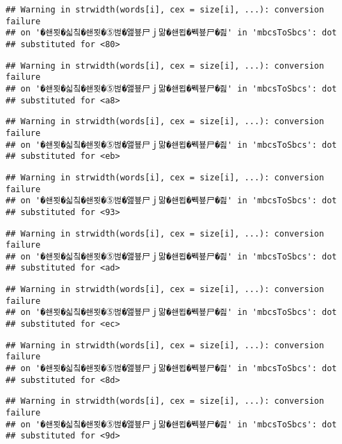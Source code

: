 \documentclass[]{article}
\begin{document}
\begin{verbatim}
## Warning in strwidth(words[i], cex = size[i], ...): conversion failure
## on '�쇈묏�싧칰�쇈묏�⑤벊�앮뵾尸ｊ맒�쇈묍�붹뵾尸�즲' in 'mbcsToSbcs': dot
## substituted for <80>
\end{verbatim}

\begin{verbatim}
## Warning in strwidth(words[i], cex = size[i], ...): conversion failure
## on '�쇈묏�싧칰�쇈묏�⑤벊�앮뵾尸ｊ맒�쇈묍�붹뵾尸�즲' in 'mbcsToSbcs': dot
## substituted for <a8>
\end{verbatim}

\begin{verbatim}
## Warning in strwidth(words[i], cex = size[i], ...): conversion failure
## on '�쇈묏�싧칰�쇈묏�⑤벊�앮뵾尸ｊ맒�쇈묍�붹뵾尸�즲' in 'mbcsToSbcs': dot
## substituted for <eb>
\end{verbatim}

\begin{verbatim}
## Warning in strwidth(words[i], cex = size[i], ...): conversion failure
## on '�쇈묏�싧칰�쇈묏�⑤벊�앮뵾尸ｊ맒�쇈묍�붹뵾尸�즲' in 'mbcsToSbcs': dot
## substituted for <93>
\end{verbatim}

\begin{verbatim}
## Warning in strwidth(words[i], cex = size[i], ...): conversion failure
## on '�쇈묏�싧칰�쇈묏�⑤벊�앮뵾尸ｊ맒�쇈묍�붹뵾尸�즲' in 'mbcsToSbcs': dot
## substituted for <ad>
\end{verbatim}

\begin{verbatim}
## Warning in strwidth(words[i], cex = size[i], ...): conversion failure
## on '�쇈묏�싧칰�쇈묏�⑤벊�앮뵾尸ｊ맒�쇈묍�붹뵾尸�즲' in 'mbcsToSbcs': dot
## substituted for <ec>
\end{verbatim}

\begin{verbatim}
## Warning in strwidth(words[i], cex = size[i], ...): conversion failure
## on '�쇈묏�싧칰�쇈묏�⑤벊�앮뵾尸ｊ맒�쇈묍�붹뵾尸�즲' in 'mbcsToSbcs': dot
## substituted for <8d>
\end{verbatim}

\begin{verbatim}
## Warning in strwidth(words[i], cex = size[i], ...): conversion failure
## on '�쇈묏�싧칰�쇈묏�⑤벊�앮뵾尸ｊ맒�쇈묍�붹뵾尸�즲' in 'mbcsToSbcs': dot
## substituted for <9d>
\end{verbatim}
\end{document}
